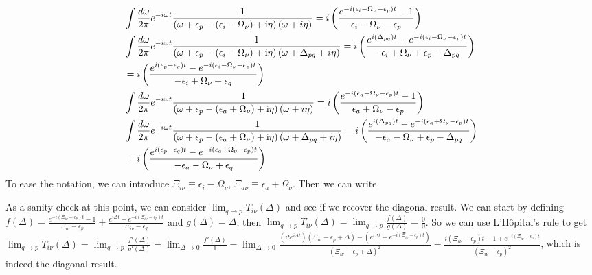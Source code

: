 \begin{align}
    &\int \frac{d\omega}{2\pi} e^{-i\omega t} \frac{1}{\left(\omega+\epsilon_p-\left(\epsilon_i-\Omega_\nu\right)+\mathrm{i} \eta\right)\left(\omega + i\eta\right)} = i\left(\frac{e^{-i(\epsilon_i - \Omega_\nu-\epsilon_p)t} - 1}{\epsilon_i - \Omega_\nu-\epsilon_p}\right) \\
    &\int \frac{d\omega}{2\pi} e^{-i\omega t} \frac{1}{\left(\omega+\epsilon_p-\left(\epsilon_i-\Omega_\nu\right)+\mathrm{i} \eta\right)\left(\omega + \Delta_{pq} + i\eta\right)} = i\left(\frac{e^{i(\Delta_{pq})t} - e^{-i(\epsilon_i - \Omega_\nu-\epsilon_p)t}}{-\epsilon_i + \Omega_\nu+\epsilon_p - \Delta_{pq}}\right) \\
&= i\left(\frac{e^{i(\epsilon_p - \epsilon_q)t} - e^{-i(\epsilon_i - \Omega_\nu-\epsilon_p)t}}{-\epsilon_i + \Omega_\nu+\epsilon_q}\right) \notag \\
    &\int \frac{d\omega}{2\pi} e^{-i\omega t} \frac{1}{\left(\omega+\epsilon_p-\left(\epsilon_a+\Omega_\nu\right)+\mathrm{i} \eta\right)\left(\omega + i\eta\right)} = i\left(\frac{e^{-i(\epsilon_a + \Omega_\nu-\epsilon_p)t} - 1}{\epsilon_a + \Omega_\nu-\epsilon_p}\right) \\
    &\int \frac{d\omega}{2\pi} e^{-i\omega t} \frac{1}{\left(\omega+\epsilon_p-\left(\epsilon_a+\Omega_\nu\right)+\mathrm{i} \eta\right)\left(\omega + \Delta_{pq} + i\eta\right)} = i\left(\frac{e^{i(\Delta_{pq})t} - e^{-i(\epsilon_a + \Omega_\nu-\epsilon_p)t}}{-\epsilon_a - \Omega_\nu+\epsilon_p - \Delta_{pq}}\right) \\
&= i\left(\frac{e^{i(\epsilon_p - \epsilon_q)t} - e^{-i(\epsilon_a + \Omega_\nu-\epsilon_p)t}}{-\epsilon_a - \Omega_\nu+\epsilon_q}\right) \notag
\end{align}
To ease the notation, we can introduce $\Xi_{i\nu} \equiv \epsilon_i - \Omega_\nu$, $\Xi_{a\nu} \equiv \epsilon_a + \Omega_\nu$. Then we can write
\begin{tcolorbox}
As a sanity check at this point, we can consider $\lim_{q \to p} T_{i\nu }(\Delta )$ and see if we recover the diagonal result. We can start by defining $f(\Delta ) = \frac{e^{-i\left(\Xi_{i\nu} - \epsilon_p\right) t}-1 }{\Xi_{i\nu}-\epsilon_p} + \frac{e^{i\Delta t} - e^{-i\left(\Xi_{i\nu} - \epsilon_p\right) t}}{\Xi_{i\nu} - \epsilon_q}$ and $g(\Delta  ) = \Delta$, then $\lim_{q \to p} T_{i\nu}(\Delta ) = \lim_{q \to p}\frac{f(\Delta )}{g(\Delta )} = \frac{0}{0}$. So we can use L'Hôpital's rule to get $\lim_{q \to p} T_{i\nu}(\Delta ) = \lim_{q \to p}\frac{f'(\Delta)}{g'(\Delta)} = \lim_{\Delta \to 0} \frac{f'(\Delta)}{1} = \lim_{\Delta \to 0} \frac{\left(i t e^{i \Delta t}\right)\left(\Xi_{i\nu} - \epsilon_p+\Delta\right)-\left(e^{i \Delta t}-e^{-i (\Xi_{i\nu} - \epsilon_p) t}\right)}{\left(\Xi_{i\nu} - \epsilon_p+\Delta\right)^2} = \frac{i \left(\Xi_{i\nu} - \epsilon_p\right) t -1 +e^{-i (\Xi_{i\nu} - \epsilon_p) t }}{\left(\Xi_{i\nu} - \epsilon_p\right)^2} $, which is indeed the diagonal result.
\end{tcolorbox}

